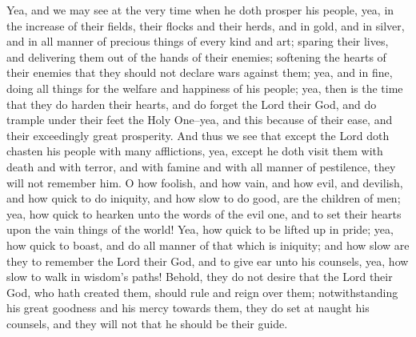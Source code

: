 Yea, and we may see at the very time when he doth prosper his people, yea, in the increase of their fields, their flocks and their herds, and in gold, and in silver, and in all manner of precious things of every kind and art; sparing their lives, and delivering them out of the hands of their enemies; softening the hearts of their enemies that they should not declare wars against them; yea, and in fine, doing all things for the welfare and happiness of his people; yea, then is the time that they do harden their hearts, and do forget the Lord their God, and do trample under their feet the Holy One--yea, and this because of their ease, and their exceedingly great prosperity.
\bverse \iffalse And thus we see that except the Lord doth chasten his people with many afflictions, yea, except he doth visit them with death and with terror, and with famine and with all manner of pestilence, they will not remember him. \fi
And thus we see that except the Lord doth chasten his people with many afflictions, yea, except he doth visit them with death and with terror, and with famine and with all manner of pestilence, they will not remember him.
\bverse \iffalse O how foolish, and how vain, and how evil, and devilish, and how quick to do iniquity, and how slow to do good, are the children of men; yea, how quick to hearken unto the words of the evil one, and to set their hearts upon the vain things of the world! \fi
O how foolish, and how vain, and how evil, and devilish, and how quick to do iniquity, and how slow to do good, are the children of men; yea, how quick to hearken unto the words of the evil one, and to set their hearts upon the vain things of the world!
\bverse \iffalse Yea, how quick to be lifted up in pride; yea, how quick to boast, and do all manner of that which is iniquity; and how slow are they to remember the Lord their God, and to give ear unto his counsels, yea, how slow to walk in wisdom's paths! \fi
Yea, how quick to be lifted up in pride; yea, how quick to boast, and do all manner of that which is iniquity; and how slow are they to remember the Lord their God, and to give ear unto his counsels, yea, how slow to walk in wisdom's paths!
\bverse \iffalse Behold, they do not desire that the Lord their God, who hath created them, should rule and reign over them; notwithstanding his great goodness and his mercy towards them, they do set at naught his counsels, and they will not that he should be their guide. \fi
Behold, they do not desire that the Lord their God, who hath created them, should rule and reign over them; notwithstanding his great goodness and his mercy towards them, they do set at naught his counsels, and they will not that he should be their guide.

